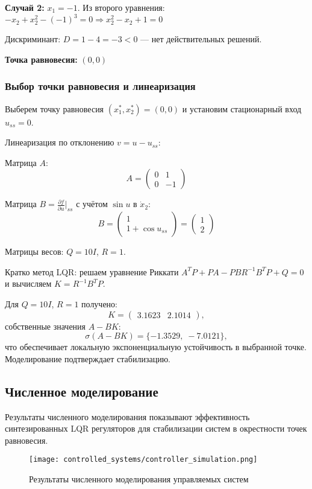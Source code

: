 \textbf{Случай 2:} $x_1 = -1$. Из второго уравнения: $-x_2 + x_2^2 - (-1)^3 = 0 \Rightarrow x_2^2 - x_2 + 1 = 0$

Дискриминант: $D = 1 - 4 = -3 < 0$ --- нет действительных решений.

\textbf{Точка равновесия:} $(0, 0)$

\subsubsection*{Выбор точки равновесия и линеаризация}

Выберем точку равновесия $(x_1^*,x_2^*) = (0,0)$ и установим стационарный вход $u_{ss} = 0$.

Линеаризация по отклонению $v = u - u_{ss}$:

Матрица $A$:
$$A = \begin{pmatrix} 0 & 1 \\ 0 & -1 \end{pmatrix}$$

Матрица $B = \frac{\partial f}{\partial u}\big|_{ss}$ с учётом $\sin u$ в $\dot x_2$:
$$B = \begin{pmatrix} 1 \\ 1 + \cos u_{ss} \end{pmatrix} = \begin{pmatrix} 1 \\ 2 \end{pmatrix}$$

Матрицы весов: $Q = 10I$, $R = 1$.

Кратко метод LQR: решаем уравнение Риккати $A^T P + PA - PBR^{-1}B^T P + Q = 0$ и вычисляем $K = R^{-1}B^T P$.

Для $Q=10I$, $R=1$ получено:
$$K = \begin{pmatrix} 3.1623 & 2.1014 \end{pmatrix},$$
собственные значения $A-BK$:
$$\sigma(A-BK) = \{-1.3529,\;-7.0121\},$$
что обеспечивает локальную экспоненциальную устойчивость в выбранной точке. Моделирование подтверждает стабилизацию.

\subsection*{Численное моделирование}

Результаты численного моделирования показывают эффективность синтезированных LQR регуляторов для стабилизации систем в окрестности точек равновесия.

\begin{figure}[H]
\centering
\texttt{[image: controlled\_systems/controller\_simulation.png]}
\caption{Результаты численного моделирования управляемых систем}
\label{fig:controller_sim}
\end{figure}
